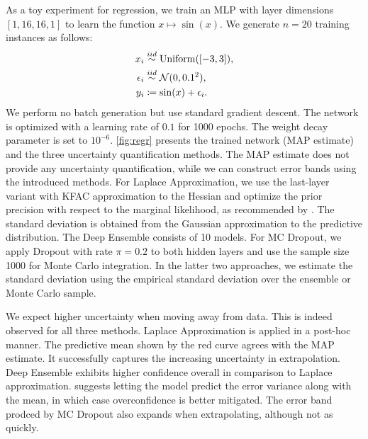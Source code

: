 As a toy experiment for regression, we train an MLP with layer dimensions $[1,16,16,1]$ to learn the function $x \mapsto \sin(x)$. We generate $n = 20$ training instances as follows:
\begin{align*}
  x_i &\overset{iid}{\sim} \operatorname{Uniform}([-3, 3]), \\
  \epsilon_i &\overset{iid}{\sim} \mathcal{N}(0, 0.1^2), \\
  y_i &\coloneqq \sin(x) + \epsilon_i.
\end{align*}
We perform no batch generation but use standard gradient descent. The network is optimized with a learning rate of $0.1$ for 1000 epochs. The weight decay parameter is set to $10^{-6}$. \cref{fig:regr} presents the trained network (MAP estimate) and the three uncertainty quantification methods. The MAP estimate does not provide any uncertainty quantification, while we can construct error bands using the introduced methods. For Laplace Approximation, we use the last-layer variant with KFAC approximation to the Hessian and optimize the prior precision with respect to the marginal likelihood, as recommended by \cite{daxbergerLaplaceRedux2021}. The standard deviation is obtained from the Gaussian approximation to the predictive distribution. The Deep Ensemble consists of 10 models. For MC Dropout, we apply Dropout with rate $\pi = 0.2$ to both hidden layers and use the sample size 1000 for Monte Carlo integration. In the latter two approaches, we estimate the standard deviation using the empirical standard deviation over the ensemble or Monte Carlo sample.

We expect higher uncertainty when moving away from data. This is indeed observed for all three methods. Laplace Approximation is applied in a post-hoc manner. The predictive mean shown by the red curve agrees with the MAP estimate. It successfully captures the increasing uncertainty in extrapolation. Deep Ensemble exhibits higher confidence overall in comparison to Laplace approximation. \cite{lakshminarayananSimpleScalablePredictive2017b} suggests letting the model predict the error variance along with the mean, in which case overconfidence is better mitigated. The error band prodced by MC Dropout also expands when extrapolating, although not as quickly.

